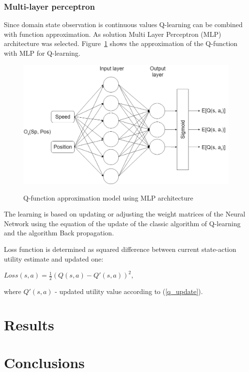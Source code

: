 \documentclass[12pt]{article}
\begin{document}
\subsubsection{Multi-layer perceptron}{
Since domain state observation is continuous values Q-learning can be combined with function approximation. As solution Multi Layer Perceptron (MLP) architecture was selected. Figure~\ref{mlp_model} shows the approximation of the Q-function with MLP for Q-learning.\par
\begin{figure}[h!]
\begin{center}
\includegraphics[scale=0.3]{images/mlp_model.png}
\label{mlp_model}
\caption{Q-function approximation model using MLP architecture}
\end{center}
\end{figure}
The learning is based on updating or adjusting the weight matrices of the Neural Network using the equation of the update of the classic algorithm of Q-learning and the algorithm Back propagation.\par
Loss function is determined as squared difference between current state-action utility estimate and updated one:
\begin{center}
$Loss(s, a) = \frac{1}{2}(Q(s, a) - Q'(s, a))^2$,
\end{center}
where $Q'(s, a)$ - updated utility value according to (\ref{q_update}).
}
\newpage
\section{Results}{

}
\newpage
\section{Conclusions}{

}
\newpage


\end{document}
